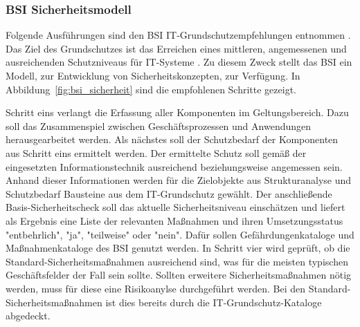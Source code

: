 \documentclass[11pt,a4paper]{report}
\begin{document}
\subsubsection{BSI Sicherheitsmodell}

Folgende Ausführungen sind den BSI IT-Grundschutzempfehlungen entnommen \cite{bsi_grundsch1,bsi_grundsch2,bsi_grundsch3,bsi_grundsch4}.
Das Ziel des Grundschutzes ist das Erreichen eines mittleren, angemessenen und ausreichenden Schutzniveaus für IT-Systeme \cite{wiki_itgrundschutz}. Zu diesem Zweck stellt das BSI ein Modell, zur Entwicklung von Sicherheitskonzepten, zur Verfügung. In Abbildung~\ref{fig:bsi_sicherheit} sind die empfohlenen Schritte gezeigt. 

Schritt eins verlangt die Erfassung aller Komponenten im Geltungsbereich. Dazu soll das Zusammenspiel zwischen Geschäftsprozessen und Anwendungen herausgearbeitet werden. Als nächstes soll der Schutzbedarf der Komponenten aus Schritt eins ermittelt werden. Der ermittelte Schutz soll gemäß der eingesetzten Informationstechnik ausreichend beziehungsweise angemessen sein. Anhand dieser Informationen werden für die Zielobjekte aus Strukturanalyse und Schutzbedarf Bausteine aus dem IT-Grundschutz gewählt. Der anschließende Basis-Sicherheitscheck soll das aktuelle Sicherheitsniveau einschätzen und liefert als Ergebnis eine Liste der relevanten Maßnahmen und ihren Umsetzungsstatus "entbehrlich", "ja", "teilweise" oder "nein". Dafür sollen Gefährdungenkataloge und Maßnahmenkataloge des BSI genutzt werden. In Schritt vier wird geprüft, ob die Standard-Sicherheitsmaßnahmen ausreichend sind, was für die meisten typischen Geschäftsfelder der Fall sein sollte. Sollten erweitere Sicherheitsmaßnahmen nötig werden, muss für diese eine Risikoanylse durchgeführt werden. Bei den Standard-Sicherheitsmaßnahmen ist dies bereits durch die IT-Grundschutz-Kataloge abgedeckt. 
\end{document}
